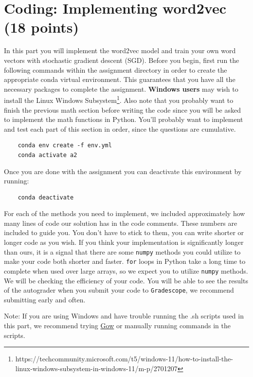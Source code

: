 \documentclass{article}
\begin{document}
\section{Coding: Implementing word2vec (18 points)}
In this part you will implement the word2vec model and train your own word vectors with stochastic gradient descent (SGD). Before you begin, first run the following commands within the assignment directory in order to create the appropriate conda virtual environment. This guarantees that you have all the necessary packages to complete the assignment. \textbf{Windows users} may wish to install the Linux Windows Subsystem\footnote{https://techcommunity.microsoft.com/t5/windows-11/how-to-install-the-linux-windows-subsystem-in-windows-11/m-p/2701207}. Also note that you probably want to finish the previous math section before writing the code since you will be asked to implement the math functions in Python. You’ll probably want to implement and test each part of this section in order, since the questions are cumulative.

\begin{verbatim}
    conda env create -f env.yml
    conda activate a2
\end{verbatim}

Once you are done with the assignment you can deactivate this environment by running:
\begin{verbatim}
    conda deactivate
\end{verbatim}

For each of the methods you need to implement, we included approximately how many lines of code our solution has in the code comments. These numbers are included to guide you. You don't have to stick to them, you can write shorter or longer code as you wish. If you think your implementation is significantly longer than ours, it is a signal that there are some \texttt{numpy} methods you could utilize to make your code both shorter and faster. \texttt{for} loops in Python take a long time to complete when used over large arrays, so we expect you to utilize \texttt{numpy} methods. We will be checking the efficiency of your code. You will be able to see the results of the autograder when you submit your code to \texttt{Gradescope}, we recommend submitting early and often.

Note: If you are using Windows and have trouble running the .sh scripts used in this part, we recommend trying \href{https://github.com/bmatzelle/gow}{Gow} or manually running commands in the scripts.
\end{document}
